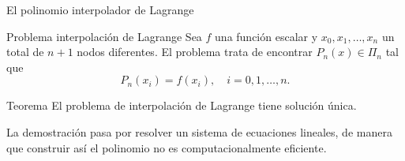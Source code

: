\begin{frame}{El polinomio interpolador de Lagrange}
  \begin{exampleblock}{Problema interpolación de Lagrange}
    Sea $f$ una función escalar y $x_0, x_1, \ldots, x_n$ un total de $n +
    1$ nodos diferentes. El problema trata de encontrar $P_n(x) \in \Pi_n$
    tal que
    \[
      P_n(x_i) = f(x_i), \quad i = 0, 1, \ldots, n.
    \]
  \end{exampleblock}

  \begin{alertblock}{Teorema}
    El problema de interpolación de Lagrange tiene solución única.
  \end{alertblock}

  La demostración pasa por resolver un sistema de ecuaciones lineales,
  de manera que construir así el polinomio \alert{no es computacionalmente
  eficiente}.
\end{frame}
